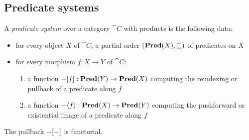 \subsection{Predicate systems}
\label{sec:predicate-system}

A \emph{predicate system} over a category $\cat{C}$ with products is the following data:
\begin{itemize}
\item for every object $X$ of $\cat{C}$, a partial order $(\mathbf{Pred}(X), \sqsubseteq)$ of predicates on $X$
\item for every morphism $f: X \to Y$ of $\cat{C}$:
   \begin{enumerate}
   \item a function $-[f]: \mathbf{Pred}(Y) \to \mathbf{Pred}(X)$ computing the reindexing or pullback of a predicate along $f$
   \item a function $-\langle f\rangle: \mathbf{Pred}(X) \to \mathbf{Pred}(Y)$ computing the pushforward or existential
   image of a predicate along $f$
   \end{enumerate}
\end{itemize}

The pullback $-[-]$ is functorial.

%
%
